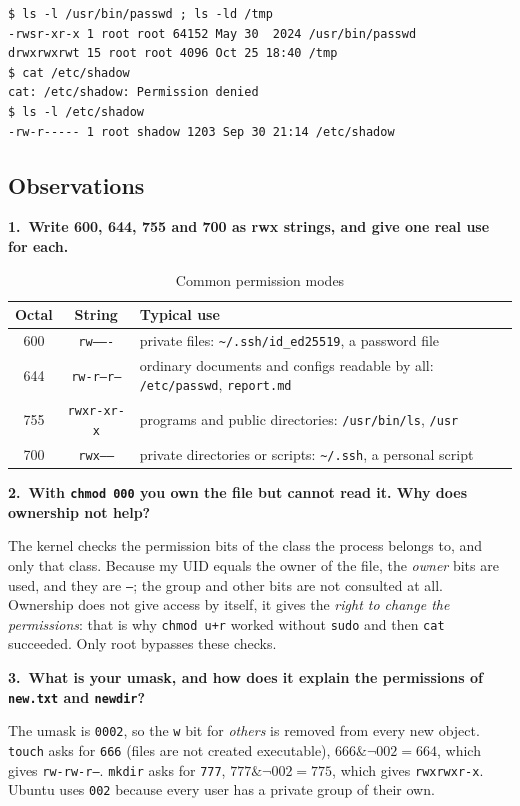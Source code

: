 \documentclass[12pt,a4paper]{article}
\newcommand{\qa}[2]{%
  \par\needspace{5\baselineskip}\medskip
  \noindent\textbf{#1.~#2}\par\smallskip\noindent}
\begin{document}
\begin{lstlisting}[style=terminal,caption={setuid, sticky bit and a protected file}]
$ ls -l /usr/bin/passwd ; ls -ld /tmp
-rwsr-xr-x 1 root root 64152 May 30  2024 /usr/bin/passwd
drwxrwxrwt 15 root root 4096 Oct 25 18:40 /tmp
$ cat /etc/shadow
cat: /etc/shadow: Permission denied
$ ls -l /etc/shadow
-rw-r----- 1 root shadow 1203 Sep 30 21:14 /etc/shadow
\end{lstlisting}

\subsection*{Observations}

\qa{1}{Write 600, 644, 755 and 700 as rwx strings, and give one real use for each.}

\begin{table}[H]
  \centering
  \caption{Common permission modes}
  \begin{tabularx}{\textwidth}{c c X}
    \toprule
    \textbf{Octal} & \textbf{String} & \textbf{Typical use} \\
    \midrule
    600 & \texttt{rw-------} & private files: \texttt{\textasciitilde/.ssh/id\_ed25519}, a password file \\
    644 & \texttt{rw-r--r--} & ordinary documents and configs readable by all: \texttt{/etc/passwd}, \texttt{report.md} \\
    755 & \texttt{rwxr-xr-x} & programs and public directories: \texttt{/usr/bin/ls}, \texttt{/usr} \\
    700 & \texttt{rwx------} & private directories or scripts: \texttt{\textasciitilde/.ssh}, a personal script \\
    \bottomrule
  \end{tabularx}
\end{table}

\qa{2}{With \texttt{chmod 000} you own the file but cannot read it. Why does ownership not help?}
The kernel checks the permission bits of the class the process belongs to, and only that class. Because my UID equals the owner of the file, the \textit{owner} bits are used, and they are \texttt{---}; the group and other bits are not consulted at all. Ownership does not give access by itself, it gives the \textit{right to change the permissions}: that is why \texttt{chmod u+r} worked without \texttt{sudo} and then \texttt{cat} succeeded. Only root bypasses these checks.

\qa{3}{What is your umask, and how does it explain the permissions of \texttt{new.txt} and \texttt{newdir}?}
The umask is \texttt{0002}, so the \texttt{w} bit for \textit{others} is removed from every new object. \texttt{touch} asks for \texttt{666} (files are not created executable), $666 \mathbin{\&} \lnot 002 = 664$, which gives \texttt{rw-rw-r--}. \texttt{mkdir} asks for \texttt{777}, $777 \mathbin{\&} \lnot 002 = 775$, which gives \texttt{rwxrwxr-x}. Ubuntu uses \texttt{002} because every user has a private group of their own.
\end{document}
